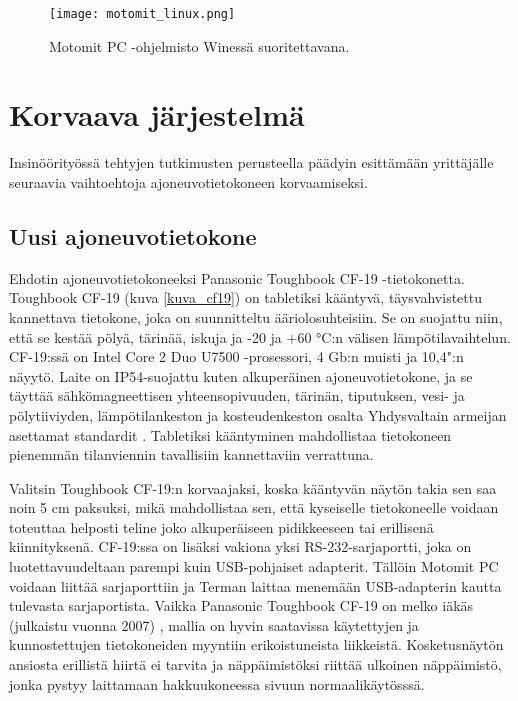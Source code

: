 \begin{figure}[H]
\centering
\texttt{[image: motomit\_linux.png]}
\caption{Motomit PC -ohjelmisto Winessä suoritettavana.}
\label{wine_motomit}
\end{figure}


\newpage

\chapter{Korvaava järjestelmä}
\label{ch:korvaava_jarjestelma}
Insinöörityössä tehtyjen tutkimusten perusteella päädyin esittämään yrittäjälle seuraavia vaihtoehtoja ajoneuvotietokoneen korvaamiseksi.

\section{Uusi ajoneuvotietokone}
Ehdotin ajoneuvotietokoneeksi Panasonic Toughbook CF-19 -tietokonetta. Toughbook CF-19 (kuva \ref{kuva_cf19}) on tabletiksi kääntyvä, täysvahvistettu kannettava tietokone, joka on suunnitteltu ääriolosuhteisiin. Se on suojattu niin, että se kestää pölyä, tärinää, iskuja ja -20 ja +60 °C:n välisen lämpötilavaihtelun. CF-19:ssä on Intel Core 2 Duo U7500 -prosessori, 4 Gb:n muisti ja 10,4":n näyytö. Laite on IP54-suojattu kuten alkuperäinen ajoneuvotietokone, ja se täyttää sähkömagneettisen yhteensopivuuden, tärinän, tiputuksen, vesi- ja pölytiiviyden, lämpötilankeston ja kosteudenkeston osalta Yhdysvaltain armeijan asettamat standardit \cite{cf19}. Tabletiksi kääntyminen mahdollistaa tietokoneen pienemmän tilanviennin tavallisiin kannettaviin verrattuna.

Valitsin Toughbook CF-19:n korvaajaksi, koska kääntyvän näytön takia sen saa noin 5 cm paksuksi, mikä mahdollistaa sen, että kyseiselle tietokoneelle voidaan toteuttaa helposti teline joko alkuperäiseen pidikkeeseen tai erillisenä kiinnityksenä. CF-19:ssa on lisäksi vakiona yksi RS-232-sarjaportti, joka on luotettavuudeltaan parempi kuin USB-pohjaiset adapterit. Tällöin Motomit PC voidaan liittää sarjaporttiin ja Terman laittaa menemään USB-adapterin kautta tulevasta sarjaportista. Vaikka Panasonic Toughbook CF-19 on melko iäkäs (julkaistu vuonna 2007) \cite{cf19}, mallia on hyvin saatavissa käytettyjen ja kunnostettujen tietokoneiden myyntiin erikoistuneista liikkeistä. Kosketusnäytön ansiosta erillistä hiirtä ei tarvita ja näppäimistöksi riittää ulkoinen näppäimistö, jonka pystyy laittamaan hakkuukoneessa sivuun normaalikäytösssä.

